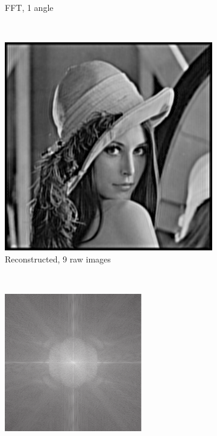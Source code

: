 \begin{figure}[h]
\begin{subfigure}[t]{0.23\textwidth}
      \caption{\gls{FFT}, 1 angle}
  \end{subfigure}\\
  \begin{subfigure}[t]{0.23\textwidth}
      \centering
      \includegraphics[width=\textwidth]{sim_slit/recon/reconstruction_no_attenuation-1}
      \caption{Reconstructed, 9 raw images}
  \end{subfigure}~
  \begin{subfigure}[t]{0.23\textwidth}
      \centering
      \includegraphics[width=\textwidth]{sim_slit/recon/FFT_reconstruction_no_attenuation}

\end{subfigure}
\end{figure}
